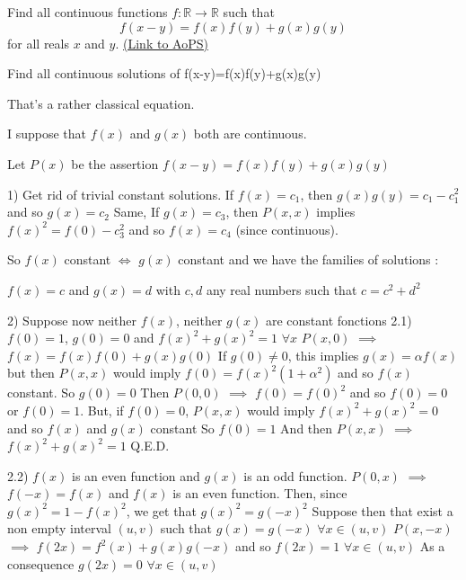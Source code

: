 \begin{problem}
	Find all continuous functions $f: \mathbb R \to \mathbb R$ such that \[f(x-y)=f(x)f(y)+g(x)g(y)\] for all reals $x$ and $y$.
	\flushright \href{https://artofproblemsolving.com/community/c6h285634}{(Link to AoPS)}
\end{problem}



\begin{solution}
	\begin{tcolorbox}Find all continuous solutions of f(x-y)=f(x)f(y)+g(x)g(y)\end{tcolorbox}

That's a rather classical equation.

I suppose that $ f(x)$ and $ g(x)$ both are continuous.

Let $ P(x)$ be the assertion $ f(x-y)=f(x)f(y)+g(x)g(y)$

1) Get rid of trivial constant solutions.
If $ f(x)=c_1$, then $ g(x)g(y)=c_1-c_1^2$ and so $ g(x)=c_2$
Same, If $ g(x)=c_3$, then $ P(x,x)$ implies $ f(x)^2=f(0)-c_3^2$ and so $ f(x)=c_4$ (since continuous).

So $ f(x)$ constant $ \iff$ $ g(x)$ constant and we have the families of solutions :

$ f(x)=c$ and $ g(x)=d$ with $ c,d$ any real numbers such that $ c=c^2+d^2$

2) Suppose now neither $ f(x)$, neither $ g(x)$ are constant fonctions
2.1) $ f(0)=1$, $ g(0)=0$ and $ f(x)^2+g(x)^2=1$ $ \forall x$
$ P(x,0)$ $ \implies$ $ f(x)=f(x)f(0)+g(x)g(0)$
If $ g(0)\neq 0$, this implies $ g(x)=\alpha f(x)$ but then $ P(x,x)$ would imply $ f(0)=f(x)^2(1+\alpha^2)$ and so $ f(x)$ constant.
So $ g(0)=0$
Then $ P(0,0)$ $ \implies$ $ f(0)=f(0)^2$ and so $ f(0)=0$ or $ f(0)=1$. But, if $ f(0)=0$, $ P(x,x)$ would imply $ f(x)^2+g(x)^2=0$ and so $ f(x)$ and $ g(x)$ constant
So $ f(0)=1$
And then $ P(x,x)$ $ \implies$ $ f(x)^2+g(x)^2=1$
Q.E.D.

2.2) $ f(x)$ is an even function and $ g(x)$ is an odd function.
$ P(0,x)$ $ \implies$ $ f(-x)=f(x)$ and $ f(x)$ is an even function.
Then, since $ g(x)^2=1-f(x)^2$, we get that $ g(x)^2=g(-x)^2$
Suppose then that exist a non empty interval $ (u,v)$ such that $ g(x)=g(-x)$ $ \forall x\in(u,v)$
$ P(x,-x)$ $ \implies$ $ f(2x)=f^2(x)+g(x)g(-x)$ and so $ f(2x)=1$ $ \forall x\in(u,v)$
As a consequence $ g(2x)=0$ $ \forall x\in(u,v)$


\end{solution}
